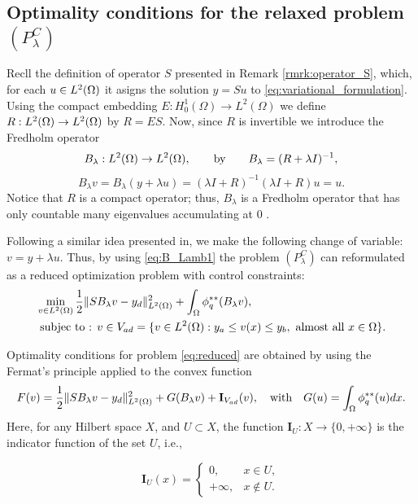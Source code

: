    \subsection{Optimality conditions for the relaxed problem $(P^C_\lambda)$}

   Recll the definition of operator $S$ presented in Remark \ref{rmrk:operator_S}, which, for each
   $u\in L^2(\Omega)$ it asigns the solution $y=Su$ to \eqref{eq:variational_formulation}. Using the 
   compact embedding $E:H_0^1(\Omega) \to L^2(\Omega)$ we define $R: L^2(\Omega) \to  L^2(\Omega)$ by $R=ES$. 
   Now, since  $R$ is invertible we introduce the Fredholm operator  
$$B_{\lambda}:L^{2}(\Omega)\to L^{2}(\Omega), \qquad \text{by} \qquad B_\lambda =(R+ \lambda I)^{-1},$$ 
\begin{equation} \label{eq:B_Lamb1}   
B_{\lambda}v=B_{\lambda}(y+\lambda u)=(\lambda I+R)^{-1}(\lambda I+R)u=u.
\end{equation}
Notice that $R$ is a compact operator; thus, $B_\lambda$ is a Fredholm operator that has only countable 
many eigenvalues accumulating at $0$ \cite{meyer-2007}.

Following a similar idea presented in\cite{meyer-2007}, we make the following change of variable:  
$v=y+\lambda u$. Thus, by using \eqref{eq:B_Lamb1} the problem $(P^C_\lambda)$ 
can reformulated as a reduced optimization problem with control constraints:
\begin{subequations}\label{eq:reduced}
\begin{align}%
    &\min_{v\in L^2(\Omega)}\frac{1}{2}\norm{SB_{\lambda}v-y_d}_{L^2(\om)}^2+\int_{\om}\phi_{q}^{**}(B_{\lambda}v), \label{eq:reduced_PClamb} \\
    & \text{ subjec to : } v \in V_{ad}=\{v\in L^2(\om): y_a\le v(x)\le y_b, \text{ almost all }x\in \om\} \label{eq:boxconst_PClamb}.
\end{align}
\end{subequations}


Optimality conditions for problem \eqref{eq:reduced} are obtained by using the Fermat's principle applied to the convex function 
$$F(v)= \frac{1}{2}\lVert SB_{\lambda}v-y_d \rVert_{L^2(\Omega)}^2+ G(B_\lambda v) + \mathbf{I}_{V_{ad}}(v), \quad \text{with} \quad G(u) = \int_\Omega \phi_{q}^{**}(u) dx.$$
Here, for any Hilbert space $X$, and $U\subset X$, the function $\mathbf{I}_{U}:X\to\{0,+\infty\}$ is the 
indicator function of the set $U$, i.e., 

$$
\mathbf{I}_{U}(x)=\begin{cases}
0, & x\in U,\\
+\infty, & x\notin U.
\end{cases}
$$

